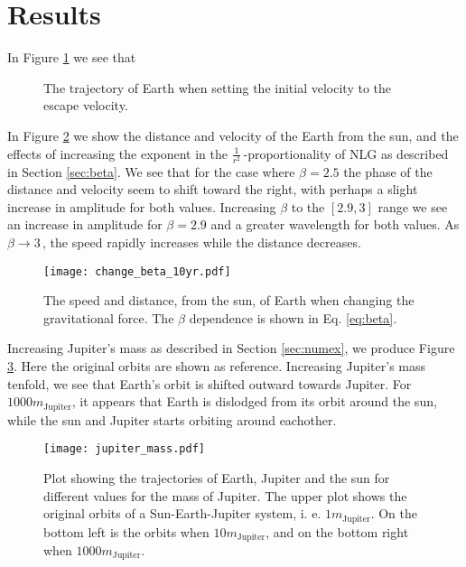 \section{Results}
\label{sec:results}



In Figure \ref{fig:earth escape} we see that
\begin{figure}[htbp]
	\centering
	\caption{The trajectory of Earth when setting the initial velocity to the escape velocity.}
	\label{fig:earth escape}
\end{figure}

In Figure \ref{fig:changing beta} we show the distance and velocity of the Earth from the sun, and the effects of increasing the exponent in the $\frac{1}{r^2}\,$-proportionality of NLG as described in Section \ref{sec:beta}. We see that for the case where $\beta=2.5$ the phase of the distance and velocity seem to shift toward the right, with perhaps a slight increase in amplitude for both values. Increasing $\beta$ to the $[2.9, 3]$ range we see an increase in amplitude for $\beta = 2.9$ and a greater wavelength for both values. As $\beta \rightarrow 3\,$, the speed rapidly increases while the distance decreases.
\begin{figure}[htbp]
	\centering
	\texttt{[image: change\_beta\_10yr.pdf]}
	\caption{The speed and distance, from the sun, of Earth when changing the gravitational force. The $\beta$ dependence is shown in Eq. \ref{eq:beta}.}
	\label{fig:changing beta}
\end{figure}

Increasing Jupiter's mass as described in Section \ref{sec:numex}, we produce Figure \ref{fig:jupiter mass}. Here the original orbits are shown as reference. Increasing Jupiter's mass tenfold, we see that Earth's orbit is shifted outward towards Jupiter.
For $1000m_{\text{Jupiter}}$, it appears that Earth is dislodged from its orbit around the sun, while the sun and Jupiter starts orbiting around eachother.
\begin{figure}[htbp]
	\centering
	\texttt{[image: jupiter\_mass.pdf]}
	\caption{Plot showing the trajectories of Earth, Jupiter and the sun for different values for the mass of Jupiter. The upper plot shows the original orbits of a Sun-Earth-Jupiter system, i. e. $1m_{\text{Jupiter}}$. On the bottom left is the orbits when $10m_{\text{Jupiter}}$, and on the bottom right when $1000m_{\text{Jupiter}}$.}
	\label{fig:jupiter mass}
\end{figure}

